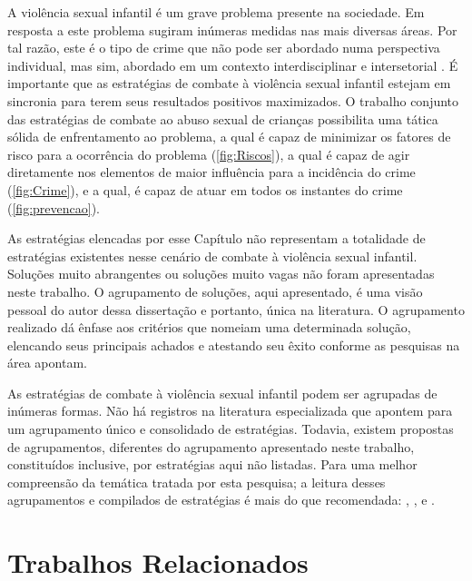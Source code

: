 A violência sexual infantil é um grave problema presente na sociedade. Em resposta a este problema sugiram inúmeras medidas nas mais diversas áreas. Por tal razão, este é o tipo de crime que não pode ser abordado numa perspectiva individual, mas sim, abordado em um contexto interdisciplinar e intersetorial \cite{maria2010papel, pinto2017avaliaccao}. É importante que as estratégias de combate à violência sexual infantil estejam em sincronia para terem seus resultados positivos maximizados. O trabalho conjunto das estratégias de combate ao abuso sexual de crianças possibilita uma tática sólida de enfrentamento ao problema, a qual é capaz de minimizar os fatores de risco para a ocorrência do problema (\autoref{fig:Riscos}), a qual é capaz de agir diretamente nos elementos de maior influência para a incidência do crime (\autoref{fig:Crime}), e a qual, é capaz de atuar em todos os instantes do crime (\autoref{fig:prevencao}).

As estratégias elencadas por esse Capítulo não representam a totalidade de estratégias existentes nesse cenário de combate à violência sexual infantil. Soluções muito abrangentes ou soluções muito vagas não foram apresentadas neste trabalho. O agrupamento de soluções, aqui apresentado, é uma visão pessoal do autor dessa dissertação e portanto, única na literatura. O agrupamento realizado dá ênfase aos critérios que nomeiam uma determinada solução, elencando seus principais achados e atestando seu êxito conforme as pesquisas na área apontam.

As estratégias de combate à violência sexual infantil podem ser agrupadas de inúmeras formas. Não há registros na literatura especializada que apontem para um agrupamento único e consolidado de estratégias. Todavia, existem propostas de agrupamentos, diferentes do agrupamento apresentado neste trabalho, constituídos inclusive, por estratégias aqui não listadas. Para uma melhor compreensão da temática tratada por esta pesquisa; a leitura desses agrupamentos e compilados de estratégias é mais do que recomendada: , ,  e .


\chapter{Trabalhos Relacionados}\label{ssec:TR}

